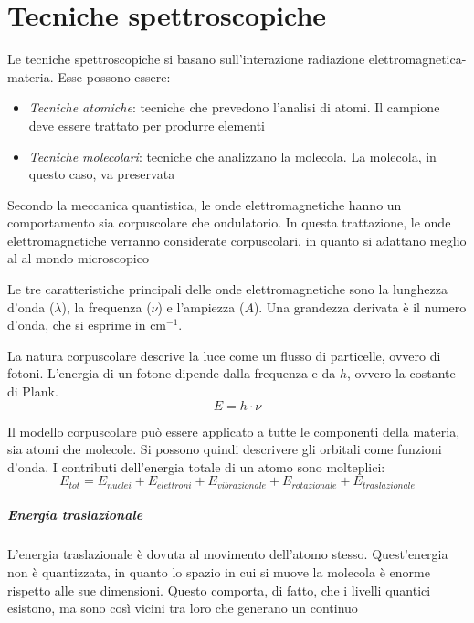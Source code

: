 \chapter{Tecniche spettroscopiche}
Le tecniche spettroscopiche si basano sull'interazione radiazione elettromagnetica-materia. Esse possono essere:
\begin{itemize}
\item \textit{Tecniche atomiche}: tecniche che prevedono l'analisi di atomi. Il campione deve essere trattato per produrre elementi
\item \textit{Tecniche molecolari}: tecniche che analizzano la molecola. La molecola, in questo caso, va preservata
\end{itemize}


Secondo la meccanica quantistica, le onde elettromagnetiche hanno un comportamento sia corpuscolare che ondulatorio. In questa trattazione, le onde elettromagnetiche verranno
considerate corpuscolari, in quanto si adattano meglio al al mondo microscopico

Le tre caratteristiche principali delle onde elettromagnetiche sono la lunghezza d'onda ($\lambda$), la frequenza ($\nu$) e l'ampiezza ($A$).
Una grandezza derivata è il numero d'onda, che si esprime in cm$^{-1}$.

La natura corpuscolare descrive la luce come un flusso di particelle, ovvero di fotoni. L'energia di un fotone dipende dalla frequenza e da $h$, ovvero la costante di Plank.
\[
E = h \cdot \nu
\]

Il modello corpuscolare può essere applicato a tutte le componenti della materia, sia atomi che molecole. Si possono quindi descrivere gli orbitali come funzioni d'onda.
I contributi dell'energia totale di un atomo sono molteplici:
\[
E_{tot} = E_{nuclei} + E_{elettroni} + E_{vibrazionale} + E_{rotazionale} + E_{traslazionale} 
\]

\paragraph{Energia traslazionale}
L'energia traslazionale è dovuta al movimento dell'atomo stesso. Quest'energia non è quantizzata, in quanto lo spazio in cui si muove la molecola è enorme rispetto alle sue dimensioni.
Questo comporta, di fatto, che i livelli quantici esistono,  ma sono così vicini tra loro che generano un continuo

